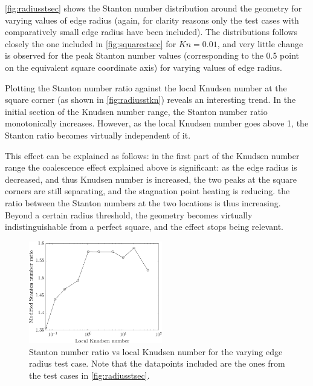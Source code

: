 \autoref{fig:radiusstsec} shows the Stanton number distribution around the geometry for varying values of edge radius (again, for clarity reasons only the test cases with comparatively small edge radius have been included). The distributions follows closely the one included in \autoref{fig:squarestsec} for $Kn = 0.01$, and very little change is observed for the peak Stanton number values (corresponding to the 0.5 point on the equivalent square coordinate axis) for varying values of edge radius. 



Plotting the Stanton number ratio against the local Knudsen number at the square corner (as shown in \autoref{fig:radiusstkn}) reveals an interesting trend. In the initial section of the Knudsen number range, the Stanton number ratio monotonically increases. However, as the local Knudsen number goes above 1, the Stanton ratio becomes virtually independent of it. 

This effect can be explained as follows: in the first part of the Knudsen number range the coalescence effect explained above is significant: as the edge radius is decreased, and thus Knudsen number is increased, the two peaks at the square corners are still separating, and the stagnation point heating is reducing. the ratio between the Stanton numbers at the two locations is thus increasing. Beyond a certain radius threshold, the geometry becomes virtually indistinguishable from a perfect square, and the effect stops being relevant.

\begin{figure}
    \centering
    \includegraphics[width=0.52\textwidth]{Images/4. Results/Radius/stkn.pdf}
    \caption[Stanton number ratio vs local Knudsen number for the varying edge radius test case.]{Stanton number ratio vs local Knudsen number for the varying edge radius test case. Note that the datapoints included are the ones from the test cases in \autoref{fig:radiusstsec}.}
    \label{fig:radiusstkn}
\end{figure}

